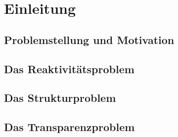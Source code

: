 
\chapter{Einleitung}
\label{chap:einleitung}

\section{Problemstellung und Motivation}%
\label{sec:problemstellung}

\section{Das Reaktivitätsproblem}%
\label{sec:reaktivitaetsproblem}

\section{Das Strukturproblem}%
\label{sec:strukturproblem}

\section{Das Transparenzproblem}%
\label{sec:transparenzproblem}

